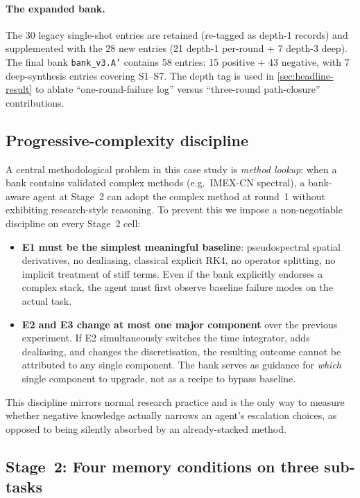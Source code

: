\paragraph{The expanded bank.} The 30 legacy single-shot entries are retained
(re-tagged as depth-1 records) and supplemented with the 28 new entries (21
depth-1 per-round + 7 depth-3 deep). The final bank \texttt{bank\_v3.A'}
contains 58 entries: 15 positive + 43 negative, with 7 deep-synthesis entries
covering S1--S7. The depth tag is used in \cref{sec:headline-result} to
ablate ``one-round-failure log'' versus ``three-round path-closure''
contributions.

\subsection{Progressive-complexity discipline}
\label{sec:progressive-discipline}

A central methodological problem in this case study is \emph{method lookup}:
when a bank contains validated complex methods (e.g.\ IMEX-CN spectral), a
bank-aware agent at Stage~2 can adopt the complex method at round~1 without
exhibiting research-style reasoning. To prevent this we impose a
non-negotiable discipline on every Stage~2 cell:
\begin{itemize}
  \item \textbf{E1 must be the simplest meaningful baseline}: pseudospectral
        spatial derivatives, no dealiasing, classical explicit RK4, no
        operator splitting, no implicit treatment of stiff terms. Even if the
        bank explicitly endorses a complex stack, the agent must first
        observe baseline failure modes on the actual task.
  \item \textbf{E2 and E3 change at most one major component} over the
        previous experiment. If E2 simultaneously switches the time
        integrator, adds dealiasing, and changes the discretisation, the
        resulting outcome cannot be attributed to any single component. The
        bank serves as guidance for \emph{which} single component to upgrade,
        not as a recipe to bypass baseline.
\end{itemize}
This discipline mirrors normal research practice and is the only way to
measure whether negative knowledge actually narrows an agent's escalation
choices, as opposed to being silently absorbed by an already-stacked method.

\subsection{Stage~2: Four memory conditions on three sub-tasks}
\label{sec:pde-stage2}

